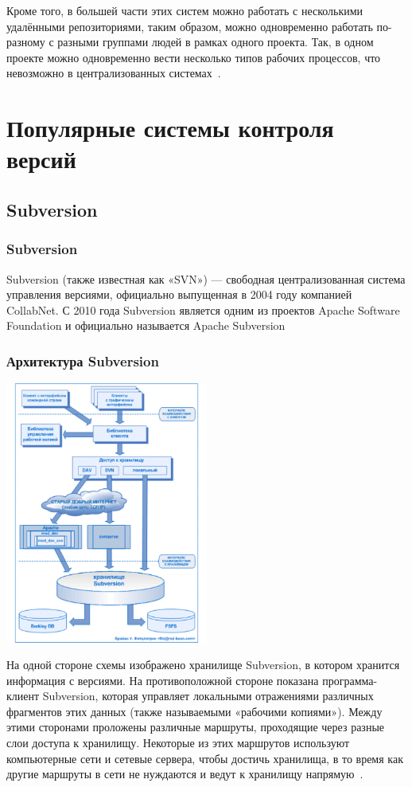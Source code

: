 \documentclass{../industrial-development}
\begin{document}
Кроме того, в большей части этих систем можно работать с несколькими удалёнными репозиториями, таким образом, можно одновременно работать по-разному с разными группами людей в рамках одного проекта. Так, в одном проекте можно одновременно вести несколько типов рабочих процессов, что невозможно в централизованных системах~\cite[с.~7]{ProGit}.

\section{Популярные системы контроля версий}

\subsection{Subversion}

\begin{frame} \frametitle{Subversion}
  \begin{block}{}
    \alert{Subversion (также известная как «SVN»)} --- свободная централизованная система управления версиями, официально выпущенная в 2004 году компанией CollabNet. С 2010 года Subversion является одним из проектов Apache Software Foundation и официально называется Apache Subversion
  \end{block}
\end{frame}

\begin{frame} \frametitle{Архитектура Subversion}
 \centerline{\includegraphics[width=0.5\textwidth]{SVNArchitecture.pdf}}
\end{frame}

\lecturenotes

На одной стороне схемы изображено хранилище Subversion, в котором хранится информация с версиями. На противоположной стороне показана программа-клиент Subversion, которая управляет локальными отражениями различных фрагментов этих данных (также называемыми «рабочими копиями»). Между этими сторонами проложены различные маршруты, проходящие через разные слои доступа к хранилищу. Некоторые из этих маршрутов используют компьютерные сети и сетевые сервера, чтобы достичь хранилища, в то время как другие маршруты в сети не нуждаются и ведут к хранилищу напрямую~\cite[с.~16--17]{VSwithSVN}. 
\end{document}
